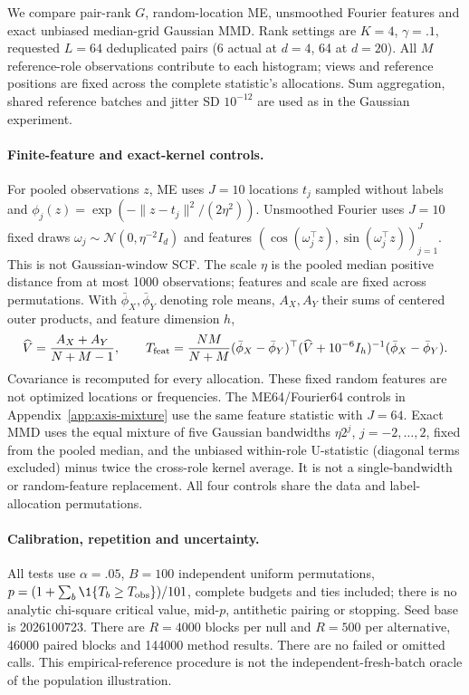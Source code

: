 We compare pair-rank $G$, random-location ME, unsmoothed Fourier features and
exact unbiased median-grid Gaussian MMD. Rank settings are $K=4$,
$\gamma=.1$, requested $L=64$ deduplicated pairs (6 actual at $d=4$, 64 at
$d=20$). All $M$ reference-role observations contribute to each histogram;
views and reference positions are fixed across the complete statistic's
allocations. Sum aggregation, shared reference batches and jitter SD $10^{-12}$
are used as in the Gaussian experiment.

\paragraph{Finite-feature and exact-kernel controls.}
For pooled observations $z$, ME uses $J=10$ locations $t_j$ sampled without
labels and $\phi_j(z)=\exp(-\|z-t_j\|^2/(2\eta^2))$.
Unsmoothed Fourier uses $J=10$ fixed draws
$\omega_j\sim\mathcal N(0,\eta^{-2}I_d)$ and features
$(\cos(\omega_j^\top z),\sin(\omega_j^\top z))_{j=1}^{J}$.
This is not Gaussian-window SCF. The scale $\eta$ is the pooled median
positive distance from at most 1000 observations; features and scale are
fixed across permutations. With $\bar\phi_X,\bar\phi_Y$ denoting role means,
$A_X,A_Y$ their sums of centered outer products, and feature dimension $h$,
\[
 \widehat V=\frac{A_X+A_Y}{N+M-1},\qquad
 T_{\rm feat}=\frac{NM}{N+M}(\bar\phi_X-\bar\phi_Y)^\top
 (\widehat V+10^{-6}I_h)^{-1}(\bar\phi_X-\bar\phi_Y).
\]
Covariance is recomputed for every allocation. These fixed random features
are not optimized locations or frequencies. The ME64/Fourier64 controls in
Appendix~\ref{app:axis-mixture} use the same feature statistic with $J=64$.
Exact MMD uses the equal mixture of five Gaussian bandwidths
$\eta 2^j$, $j=-2,\ldots,2$, fixed from the pooled median, and the unbiased
within-role U-statistic (diagonal terms excluded) minus twice the cross-role
kernel average. It is not a single-bandwidth or random-feature replacement.
All four controls share the data and label-allocation permutations.

\paragraph{Calibration, repetition and uncertainty.}
All tests use $\alpha=.05$, $B=100$ independent uniform permutations,
$p=(1+\sum_b\1\{T_b\ge T_{\rm obs}\})/101$, complete budgets and ties included;
there is no analytic chi-square critical value, mid-$p$, antithetic pairing or
stopping. Seed base is 2026100723. There are $R=4000$ blocks per null and
$R=500$ per alternative, 46000 paired blocks and 144000 method results.
There are no failed or omitted calls. This empirical-reference procedure is
not the independent-fresh-batch oracle of the population illustration.

